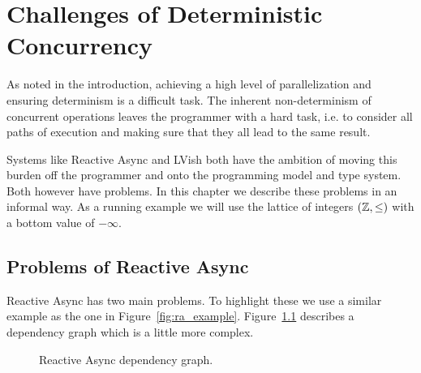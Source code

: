 \chapter{Challenges of Deterministic Concurrency}
\label{cha:challenges}





As noted in the introduction, achieving a high level of parallelization and
ensuring determinism is a difficult task. The inherent non-determinism of
concurrent operations leaves the programmer with a hard task, i.e. to consider
all paths of execution and making sure that they all lead to the same result.

Systems like Reactive Async and LVish both have the ambition of moving this
burden off the programmer and onto the programming model and type system. Both
however have problems. In this chapter we describe these problems in an informal
way. As a running example we will use the lattice of integers $(\mathbb{Z},
\leq)$ with a bottom value of $-\infty$.

\section{Problems of Reactive Async}%
\label{sec:problems_of_reactive_async}

Reactive Async has two main problems. To highlight these we use a similar
example as the one in Figure~\ref{fig:ra_example}. Figure~\ref{fig:ra_example2}
describes a dependency graph which is a little more complex.

\begin{figure}
  \centering
  \caption{Reactive Async dependency graph.}
  \label{fig:ra_example2}
\end{figure}


